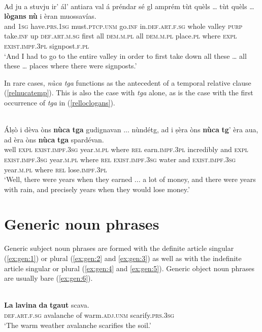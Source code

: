 \ea

\\
\gll Ad ju a stuvju ir’ ál’ antiara val á préndar sé gl amprém tùt quèls … tùt quèls … \textbf{lògans} \textbf{nù} i èran muossavías.\\
and \textsc{1sg} have.\textsc{prs.1sg} must.\textsc{ptcp.unm} go.\textsc{inf} in.\textsc{def.art.f.sg} whole valley \textsc{purp} take.\textsc{inf} up \textsc{def.art.m.sg} first all \textsc{dem.m.pl} {} all \textsc{dem.m.pl} {} place.\textsc{pl} where \textsc{expl} \textsc{exist.impf.3pl} signpost.\textsc{f.pl}\\
\glt `And I had to go to the entire valley in order to first take down all these … all these … places where there were signposts.'
\z

In rare cases, \textit{nùca tga} functions as the antecedent of a temporal relative clause (\ref{relnucatemp}). This is also the case with \textit{tga} alone, as is the case with the first occurrence of \textit{tga} in (\ref{relloclogans}).

\ea\label{relnucatemp}
\\
\gll Álṣò i dèva òns \textbf{nùca} \textbf{tga} gudignavan ... nùndétg, ad i ṣèra òns \textbf{nùca} \textbf{tg}’ èra aua, ad èra òns \textbf{nùca} \textbf{tga} spardévan.\\
well \textsc{expl} \textsc{exist.impf.3sg} year.\textsc{m.pl} where \textsc{rel} earn.\textsc{impf.3pl} {} incredibly and \textsc{expl} \textsc{exist.impf.3sg} year.\textsc{m.pl} where \textsc{rel} \textsc{exist.impf.3sg} water and \textsc{exist.impf.3sg} year.\textsc{m.pl} where \textsc{rel} lose.\textsc{impf.3pl} \\
\glt `Well, there were years when they earned ... a lot of money, and there were years with rain, and precisely years when they would lose money.'
\z

\section{Generic noun phrases}
Generic subject noun phrases are formed with the definite article singular (\ref{ex:gen:1}) or plural (\ref{ex:gen:2} and \ref{ex:gen:3}) as well as with the indefinite article singular or plural (\ref{ex:gen:4} and \ref{ex:gen:5}). Generic object noun phrases are usually bare (\ref{ex:gen:6}).

\ea
\label{ex:gen:1}
\\
\gll \textbf{La} \textbf{lavina} \textbf{da} \textbf{tgaut} scava.\\
\textsc{def.art.f.sg} avalanche of warm.\textsc{adj.unm} scarify.\textsc{prs.3sg}\\
\glt `The warm weather avalanche scarifies the soil.'
\z


